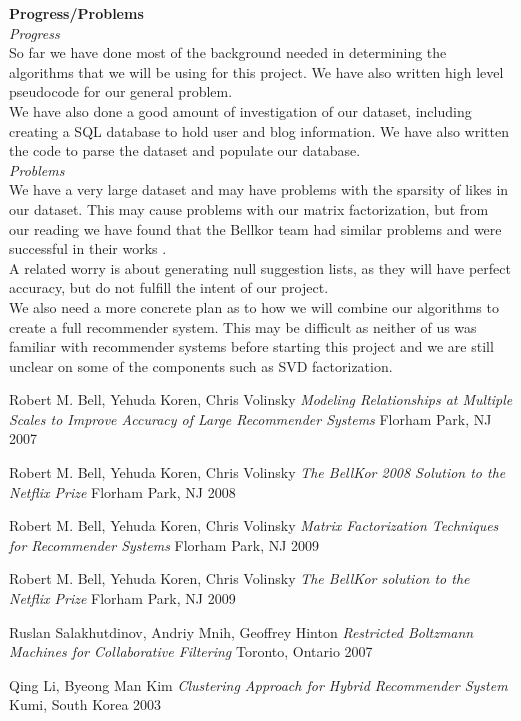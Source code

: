 \documentclass[12pt]{article} %
\begin{document}
\noindent \textbf{Progress/Problems} \\
\noindent 
\textit{Progress}\\
So far we have done most of the background needed in determining the algorithms that we will be using for this project. We have also written high level pseudocode for our general problem.\\
We have also done a good amount of investigation of our dataset, including creating a SQL database to hold user and blog information. We have also written the code to parse the dataset and populate our database.\\
\textit{Problems}\\
We have a very large dataset and may have problems with the sparsity of likes in our dataset. This may cause problems with our matrix factorization, but from our reading we have found that the Bellkor team had similar problems and were successful in their works \cite{bell08}.\\
A related worry is about generating null suggestion lists, as they will have perfect accuracy, but do not fulfill the intent of our project.\\
We also need a more concrete plan as to how we will combine our algorithms to create a full recommender system. This may be difficult as neither of us was familiar with recommender systems before starting this project and we are still unclear on some of the components such as SVD factorization.\\

\begin{thebibliography}{1}
  Robert M. Bell, Yehuda Koren, Chris Volinsky
  \emph{Modeling Relationships at Multiple Scales to Improve Accuracy of Large Recommender Systems}
  Florham Park, NJ
  2007
  
  Robert M. Bell, Yehuda Koren, Chris Volinsky
  \emph{The BellKor 2008 Solution to the Netflix Prize}
  Florham Park, NJ
  2008
  
  Robert M. Bell, Yehuda Koren, Chris Volinsky
  \emph{Matrix Factorization Techniques for Recommender Systems}
  Florham Park, NJ
  2009
  
  Robert M. Bell, Yehuda Koren, Chris Volinsky
  \emph{The BellKor solution to the Netflix Prize}
  Florham Park, NJ
  2009

  Ruslan Salakhutdinov, Andriy Mnih, Geoffrey Hinton
  \emph{Restricted Boltzmann Machines for Collaborative Filtering}
  Toronto, Ontario
  2007
  
  Qing Li, Byeong Man Kim
  \emph{Clustering Approach for Hybrid Recommender System}
  Kumi, South Korea
  2003
\end{thebibliography}
\end{document}
